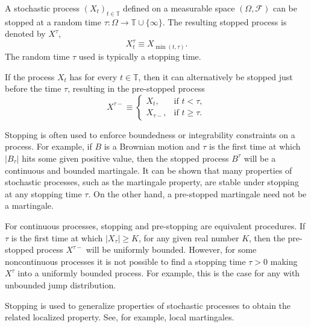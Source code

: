 \documentclass[12pt]{article}
\begin{document}
A stochastic process $(X_t)_{t\in\mathbb{T}}$ defined on a measurable space $(\Omega,\mathcal{F})$ can be stopped at a random time $\tau\colon\Omega\rightarrow\mathbb{T}\cup\{\infty\}$. The resulting stopped process is denoted by $X^{\tau}$,
\begin{equation*}
X^\tau_t\equiv X_{\min(t,\tau)}.
\end{equation*}
The random time $\tau$ used is typically a stopping time.

If the process $X_t$ has  for every $t\in\mathbb{T}$, then it can alternatively be stopped just before the time $\tau$, resulting in the pre-stopped process
\begin{equation*}
X^{\tau-}\equiv\left\{
\begin{array}{ll}
X_t,&\textrm{if }t<\tau,\\
X_{\tau-},&\textrm{if }t\ge\tau.
\end{array}
\right.
\end{equation*}

Stopping is often used to enforce boundedness or integrability constraints on a process.
For example, if $B$ is a Brownian motion and $\tau$ is the first time at which $|B_{\tau}|$ hits some given positive value, then the stopped process $B^{\tau}$ will be a continuous and bounded martingale.
It can be shown that many properties of stochastic processes, such as the martingale property, are stable under stopping at any stopping time $\tau$. On the other hand, a pre-stopped martingale need not be a martingale.

For continuous processes, stopping and pre-stopping are equivalent procedures.
If $\tau$ is the first time at which $|X_\tau|\ge K$, for any given real number $K$, then the pre-stopped process $X^{\tau-}$ will be uniformly bounded.
However, for some noncontinuous processes it is not possible to find a stopping time $\tau>0$ making $X^\tau$ into a uniformly bounded process. For example, this is the case for any  with unbounded jump distribution.

Stopping is used to generalize properties of stochastic processes to obtain the related localized property. See, for example, local martingales.

\end{document}
